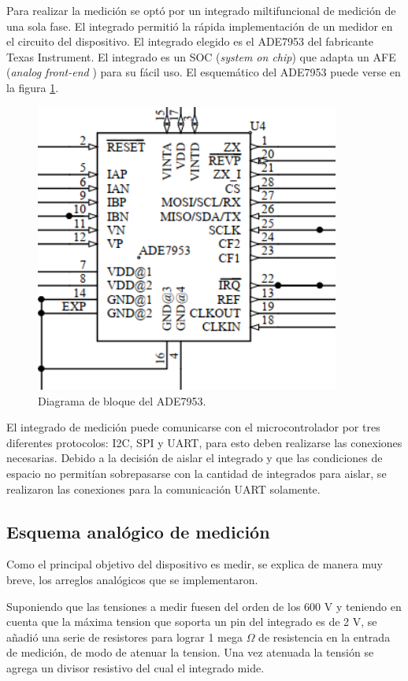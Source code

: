 Para realizar la medición se optó por un integrado miltifuncional de medición de una sola fase. El  integrado permitió la rápida implementación de un medidor en el circuito del dispositivo. El integrado elegido es el ADE7953 del fabricante Texas Instrument. El integrado es un SOC (\textit{system on chip}) que adapta un AFE (\textit{analog front-end} ) para su fácil uso. El esquemático del ADE7953 puede verse en la  figura \ref{fig:ade79esquem}.

\begin{figure}[htb]
	\centering
	\includegraphics[width=100mm,keepaspectratio]{Figures/ade7953.png}
	\caption{Diagrama de bloque del ADE7953.}
	\label{fig:ade79esquem}
\end{figure}

El integrado de medición puede comunicarse con el microcontrolador por tres diferentes protocolos: I2C, SPI y UART, para esto deben realizarse las conexiones necesarias. Debido a la decisión de aislar el integrado y que las condiciones de espacio no permitían sobrepasarse con la cantidad de integrados para aislar, se realizaron las conexiones para la comunicación UART solamente.

\subsection{Esquema analógico de medición }
Como el principal objetivo del dispositivo es medir, se explica de manera muy breve, los arreglos analógicos que se implementaron.

Suponiendo que las tensiones a medir fuesen del orden de los 600 V y teniendo en cuenta que la máxima tension que soporta un pin del integrado es de 2 V, se añadió una serie de resistores para lograr 1 mega $\Omega$  de resistencia en la entrada de medición, de modo de atenuar la tension. Una vez atenuada la tensión se agrega un divisor resistivo del cual el integrado mide.

